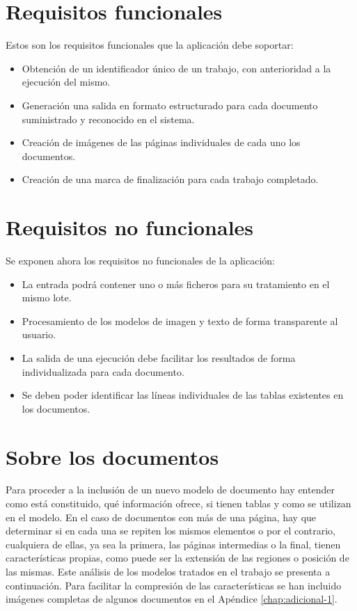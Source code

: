 \section{Requisitos funcionales}

Estos son los requisitos funcionales que la aplicación debe soportar:

\begin{itemize}
	\item Obtención de un identificador único de un trabajo, con anterioridad a la ejecución del mismo.
	\item Generación una salida en formato estructurado para cada documento suministrado y reconocido en el sistema.
	\item Creación de imágenes de las páginas individuales de cada uno los documentos.
	\item Creación de una marca de finalización para cada trabajo completado.
\end{itemize}


\section{Requisitos no funcionales}

Se exponen ahora los requisitos no funcionales de la aplicación:

\begin{itemize}
	\item La entrada podrá contener uno o más ficheros para su tratamiento en el mismo lote.
	\item Procesamiento de los modelos de imagen y texto de forma transparente al usuario.
	\item La salida de una ejecución debe facilitar los resultados de forma individualizada para cada documento.
	\item Se deben poder identificar las líneas individuales de las tablas existentes en los documentos.
\end{itemize}

\section{Sobre los documentos}
\label{sec:sobre-los-documentos}

Para proceder a la inclusión de un nuevo modelo de documento hay entender como está constituido, qué información ofrece, si tienen tablas y como se utilizan en el modelo. En el caso de documentos con más de una página, hay que determinar si en cada una se repiten los mismos elementos o por el contrario, cualquiera de ellas, ya sea la primera, las páginas intermedias o la final, tienen características propias, como puede ser la extensión de las regiones o posición de las mismas. Este análisis de los modelos tratados en el trabajo se presenta a continuación. Para facilitar la compresión de las características se han incluido imágenes completas de algunos documentos en el Apéndice \ref{chap:adicional-1}.

